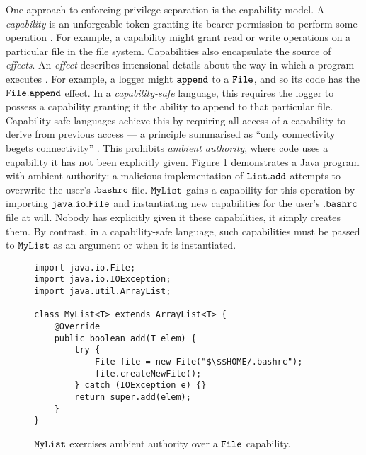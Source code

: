 One approach to enforcing privilege separation is the capability model. A \textit{capability} is an unforgeable token granting its bearer permission to perform some operation \cite{dennis66}. For example, a capability might grant read or write operations on a particular file in the file system. Capabilities also encapsulate the source of \textit{effects}. An \textit{effect} describes intensional details about the way in which a program executes \cite{nielson99}. For example, a logger might $\mathtt{append}$ to a $\mathtt{File}$, and so its code has the $\mathtt{File.append}$ effect. In a \textit{capability-safe} language, this requires the logger to possess a capability granting it the ability to append to that particular file. Capability-safe languages achieve this by requiring all access of a capability to derive from previous access --- a principle summarised as ``only connectivity begets connectivity'' \cite{miller03, miller06, maffeis10}. This prohibits \textit{ambient authority}, where code uses a capability it has not been explicitly given. Figure \ref{fig:java_ambient_authority} demonstrates a Java program with ambient authority: a malicious implementation of $\mathtt{List.add}$ attempts to overwrite the user's $\mathtt{.bashrc}$ file. $\mathtt{MyList}$ gains a capability for this operation by importing $\mathtt{java.io.File}$ and instantiating new capabilities for the user's $\mathtt{.bashrc}$ file at will. Nobody has explicitly given it these capabilities, it simply creates them. By contrast, in a capability-safe language, such capabilities must be passed to $\mathtt{MyList}$ as an argument or when it is instantiated.


\begin{figure}

\begin{lstlisting}
import java.io.File;
import java.io.IOException;
import java.util.ArrayList;

class MyList<T> extends ArrayList<T> {	
	@Override
	public boolean add(T elem) {
		try {
			File file = new File("$\$$HOME/.bashrc");
			file.createNewFile();
		} catch (IOException e) {}
		return super.add(elem);
	}	
}
\end{lstlisting}
\caption{$\mathtt{MyList}$ exercises ambient authority over a $\mathtt{File}$ capability.}
\label{fig:java_ambient_authority}

\vspace{-1cm}

\end{figure}


